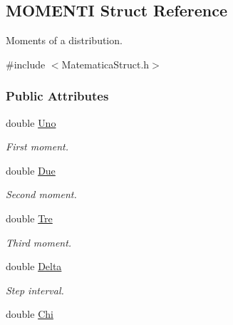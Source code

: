 \hypertarget{structMOMENTI}{}\subsection{M\+O\+M\+E\+N\+TI Struct Reference}
\label{structMOMENTI}


Moments of a distribution.  




{\ttfamily \#include $<$Matematica\+Struct.\+h$>$}

\subsubsection*{Public Attributes}
\begin{DoxyCompactItemize}
\item 
double \hyperlink{structMOMENTI_ace35fa89d42816a5d3c59ff882b65e4c}{Uno}\hypertarget{structMOMENTI_ace35fa89d42816a5d3c59ff882b65e4c}{}\label{structMOMENTI_ace35fa89d42816a5d3c59ff882b65e4c}

\begin{DoxyCompactList}\small\item\em First moment. \end{DoxyCompactList}\item 
double \hyperlink{structMOMENTI_a15d9d06c593c6771637966bd64f78b6f}{Due}\hypertarget{structMOMENTI_a15d9d06c593c6771637966bd64f78b6f}{}\label{structMOMENTI_a15d9d06c593c6771637966bd64f78b6f}

\begin{DoxyCompactList}\small\item\em Second moment. \end{DoxyCompactList}\item 
double \hyperlink{structMOMENTI_abfbb9b4d7abdcac6679c9c91109bfc6b}{Tre}\hypertarget{structMOMENTI_abfbb9b4d7abdcac6679c9c91109bfc6b}{}\label{structMOMENTI_abfbb9b4d7abdcac6679c9c91109bfc6b}

\begin{DoxyCompactList}\small\item\em Third moment. \end{DoxyCompactList}\item 
double \hyperlink{structMOMENTI_a8466803d0c40a49457299b39f72651fe}{Delta}\hypertarget{structMOMENTI_a8466803d0c40a49457299b39f72651fe}{}\label{structMOMENTI_a8466803d0c40a49457299b39f72651fe}

\begin{DoxyCompactList}\small\item\em Step interval. \end{DoxyCompactList}\item 
double \hyperlink{structMOMENTI_a5fd19409bf55b66fb6743f0c17f4ecd5}{Chi}\hypertarget{structMOMENTI_a5fd19409bf55b66fb6743f0c17f4ecd5}{}\label{structMOMENTI_a5fd19409bf55b66fb6743f0c17f4ecd5}


\end{DoxyCompactItemize}
